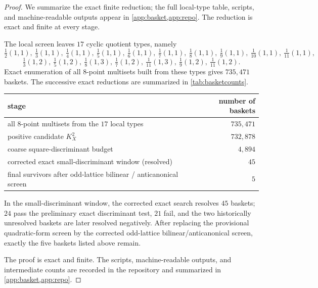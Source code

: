 \documentclass[11pt]{article}
\theoremstyle{definition}
\begin{document}
\begin{proof}
We summarize the exact finite reduction; the full local-type table, scripts, and machine-readable outputs appear in \cref{app:basket,app:repo}. The reduction is exact and finite at every stage.

The local screen leaves $17$ cyclic quotient types, namely
\[
\tfrac12(1,1),\ \tfrac13(1,1),\ \tfrac14(1,1),\ \tfrac15(1,1),\ \tfrac16(1,1),\ \tfrac17(1,1),\ \tfrac18(1,1),\ \tfrac19(1,1),\ \tfrac1{10}(1,1),\ \tfrac1{11}(1,1),
\]
\[
\tfrac13(1,2),\ \tfrac15(1,2),\ \tfrac18(1,3),\ \tfrac17(1,2),\ \tfrac1{11}(1,3),\ \tfrac19(1,2),\ \tfrac1{11}(1,2).
\]
Exact enumeration of all $8$-point multisets built from these types gives $735{,}471$ baskets. The successive exact reductions are summarized in \cref{tab:basketcounts}.

\begin{center}
\begin{tabular}{l r}
\toprule
stage & number of baskets \\
\midrule
all $8$-point multisets from the $17$ local types & $735{,}471$ \\
positive candidate $K_X^2$ & $732{,}878$ \\
coarse square-discriminant budget & $4{,}894$ \\
corrected exact small-discriminant window (resolved) & $45$ \\
final survivors after odd-lattice bilinear / anticanonical screen & $5$ \\
\bottomrule
\end{tabular}
\end{center}

\begin{table}[h]
\centering
\caption{Exact basket-reduction counts used in \cref{prop:final-baskets}.}
\label{tab:basketcounts}
\end{table}

In the small-discriminant window, the corrected exact search resolves $45$ baskets; $24$ pass the preliminary exact discriminant test, $21$ fail, and the two historically unresolved baskets are later resolved negatively. After replacing the provisional quadratic-form screen by the corrected odd-lattice bilinear/anticanonical screen, exactly the five baskets listed above remain.

The proof is exact and finite. The scripts, machine-readable outputs, and intermediate counts are recorded in the repository and summarized in \cref{app:basket,app:repo}.
\end{proof}
\end{document}
